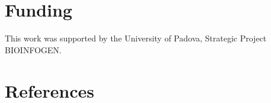\documentclass[review]{elsarticle}
\begin{document}
%
%
%
\section*{Funding}
This work was supported by the University of Padova, Strategic Project BIOINFOGEN.
\section*{References}


\end{document}
